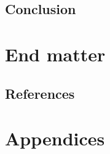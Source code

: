 \documentclass[letterpaper,10pt,english]{jupyterBook}
\begin{document}
\chapter{Conclusion}
\label{\detokenize{content/chapter_08_conclusion/main:conclusion}}\label{\detokenize{content/chapter_08_conclusion/main::doc}}

\part{End matter}


\chapter{References}
\label{\detokenize{references:references}}\label{\detokenize{references::doc}}
\sphinxAtStartPar



\part{Appendices}
\end{document}
